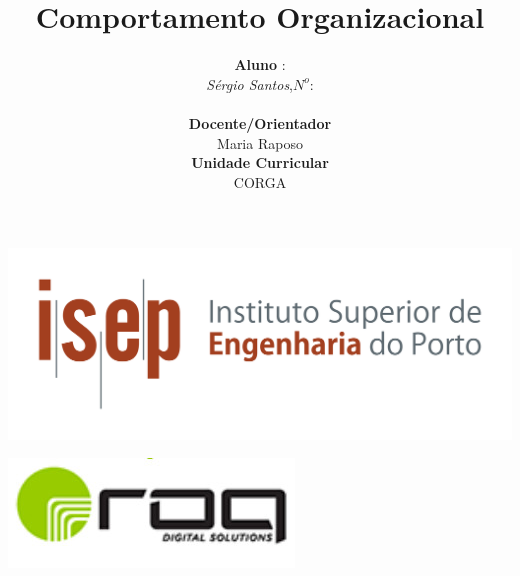 \begin{minipage}{\linewidth}
\title{Comportamento Organizacional}
\author{
\begin{minipage}{0.4\linewidth}
\textbf{Aluno} \; : \\
\emph{S\'{e}rgio Santos},\;$N^o$: \\
\end{minipage}
\hspace{.5cm}
\begin{minipage}{0.4\linewidth}
\centering
\textbf{Docente/Orientador} \\
Maria Raposo \\
\textbf{Unidade Curricular} \\
CORGA \\
\end{minipage}
}
\begin{titlepage}
\includegraphics[scale=0.60]{./image/capa/ISEP_marca_cor_grande.png}
\maketitle
\vspace{4cm}
\vspace{4cm}
\begin{flushleft}
\includegraphics[scale=0.50]{./image/ROQ/ROQ.jpg}
\end{flushleft}
\end{titlepage}
\end{minipage}
